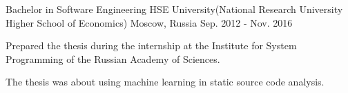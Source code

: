 

\begin{cventries}

  \cventry
    {Bachelor in Software Engineering} %
    {HSE University(National Research University Higher School of Economics)} %
    {Moscow, Russia} %
    {Sep. 2012 - Nov. 2016} %
    {
      \begin{cvitems} %
        \item {Prepared the thesis during the internship at the Institute for System Programming of the Russian Academy of Sciences.}
        \item {The thesis was about using machine learning in static source code analysis.}
      \end{cvitems}
    }

\end{cventries}
